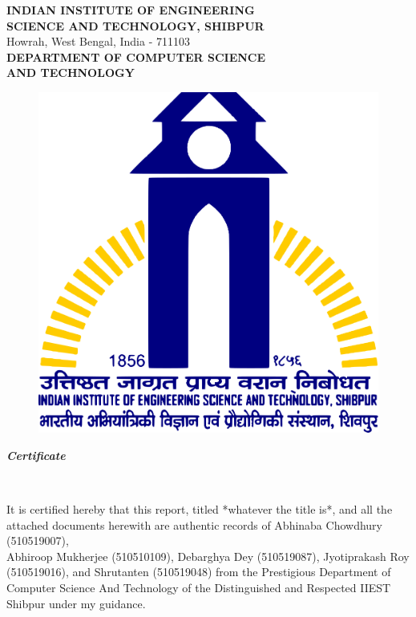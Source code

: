 \documentclass[a4paper]{article}
\begin{document}
\begin{titlepage}

    \begin{center}
        \textup{\large  \textbf{INDIAN INSTITUTE OF ENGINEERING}\\\textbf{SCIENCE AND TECHNOLOGY, SHIBPUR}}\\ Howrah, West Bengal, India - 711103\\[0.5cm]\textbf{\large DEPARTMENT OF COMPUTER SCIENCE}\\\textbf{\large AND TECHNOLOGY}

        \begin{center}
            \begin{figure}[h]   %
                \centering
                \includegraphics[width=0.3\linewidth]{Pictures/IIESTS Logo.png}
            \end{figure}
        \end{center}



        \begin{LARGE}
            \textbf{\textit {Certificate}}
        \end{LARGE}\\[1.2cm]
    \end{center}

    It is certified hereby that this report, titled *whatever the title is*, and all the attached
    documents herewith are authentic records of Abhinaba Chowdhury (510519007),\\Abhiroop Mukherjee (510510109), Debarghya Dey (510519087),
    Jyotiprakash Roy \\(510519016), and Shrutanten (510519048) from the Prestigious Department of \\Computer Science And Technology
    of the Distinguished and Respected IIEST Shibpur under my guidance.


\end{titlepage}
\end{document}
